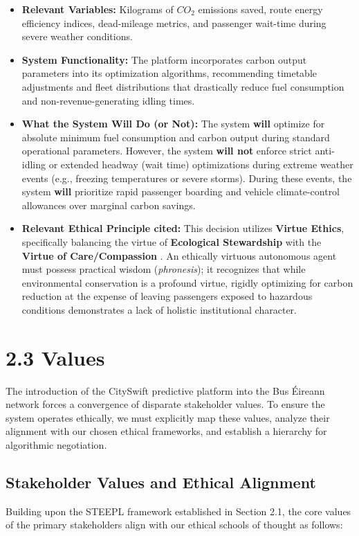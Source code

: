 \documentclass[]
{UCD_CS_41820_Report}
\begin{document}
\begin{itemize}
  \item \textbf{Relevant Variables:} Kilograms of $CO_{2}$ emissions saved, route energy efficiency indices, dead-mileage metrics, and passenger wait-time during severe weather conditions.
  \item \textbf{System Functionality:} The platform incorporates carbon output parameters into its optimization algorithms, recommending timetable adjustments and fleet distributions that drastically reduce fuel consumption and non-revenue-generating idling times.
  \item \textbf{What the System Will Do (or Not):} The system \textbf{will} optimize for absolute minimum fuel consumption and carbon output during standard operational parameters. However, the system \textbf{will not} enforce strict anti-idling or extended headway (wait time) optimizations during extreme weather events (e.g., freezing temperatures or severe storms). During these events, the system \textbf{will} prioritize rapid passenger boarding and vehicle climate-control allowances over marginal carbon savings.
  \item \textbf{Relevant Ethical Principle cited:} This decision utilizes \textbf{Virtue Ethics}, specifically balancing the virtue of \textbf{Ecological Stewardship} with the \textbf{Virtue of Care/Compassion} \cite{relational_ethics}. An ethically virtuous autonomous agent must possess practical wisdom (\textit{phronesis}); it recognizes that while environmental conservation is a profound virtue, rigidly optimizing for carbon reduction at the expense of leaving passengers exposed to hazardous conditions demonstrates a lack of holistic institutional character.
\end{itemize}

\section*{2.3 Values}

The introduction of the CitySwift predictive platform into the Bus Éireann network forces a convergence of disparate stakeholder values. To ensure the system operates ethically, we must explicitly map these values, analyze their alignment with our chosen ethical frameworks, and establish a hierarchy for algorithmic negotiation.

\subsection*{Stakeholder Values and Ethical Alignment}
Building upon the STEEPL framework established in Section 2.1, the core values of the primary stakeholders align with our ethical schools of thought as follows:
\end{document}
